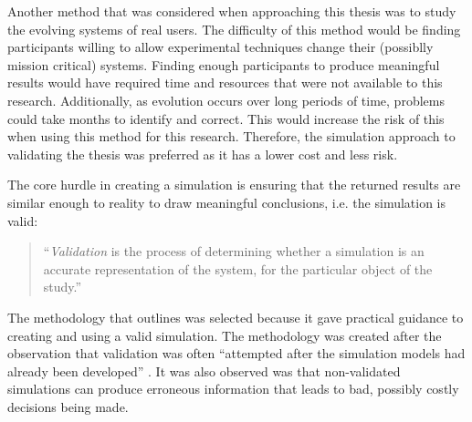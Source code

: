 Another method that was considered when approaching this thesis was to study the evolving systems of real users.
The difficulty of this method would be finding participants willing to allow experimental techniques change their (possiblly mission critical) systems.
Finding enough participants to produce meaningful results would have required time and resources that were not available to this research.
Additionally, as evolution occurs over long periods of time, problems could take months to identify and correct.
This would increase the risk of this when using this method for this research. 
Therefore, the simulation approach to validating the thesis was preferred as it has a lower cost and less risk.

The core hurdle in creating a simulation is ensuring that the returned results are similar enough to reality to draw meaningful conclusions, i.e. the simulation is valid:
\begin{quotation}
``\textit{Validation} is the process of determining whether a simulation is an accurate representation of the system, for the particular object of the study.'' \citep{Law2005}
\end{quotation}

The methodology that \cite{Law2005} outlines was selected because it gave practical guidance to creating and using a valid simulation.
The methodology was created after the observation that validation was often ``attempted after the simulation models had already been developed'' \citep{Law2005}.
It was also observed was that non-validated simulations can produce erroneous information that leads to bad, possibly costly decisions being made.

